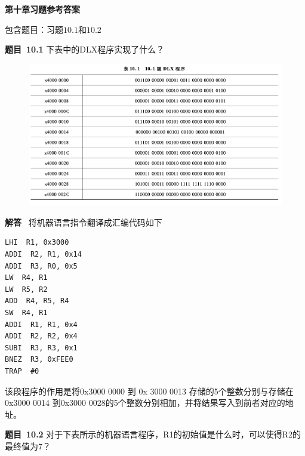 \documentclass[10pt,a4paper,UTF8]{ctexart}
\newcommand{\problemname}{待定义}
\newenvironment{problem}{\begin{shaded}\par\noindent\textbf{题目\  \problemname}}{\end{shaded}\par}
\newenvironment{solution}{\par\noindent\textbf{解答}\ }{\par}
\begin{document}
\begin{center}
\LARGE\textbf{第十章习题参考答案}
\end{center}

{\kaishu 包含题目：习题$10.1$和$10.2$}



	



\renewcommand{\problemname}{10.1}
\begin{problem}
	下表中的DLX程序实现了什么？
\end{problem}

\begin{figure}[H]
	\centering
	\includegraphics[scale=0.5]{img/10.1}
\end{figure}

\begin{solution}
	将机器语言指令翻译成汇编代码如下
	\begin{lstlisting}
LHI  R1, 0x3000       
ADDI  R2, R1, 0x14     
ADDI  R3, R0, 0x5     
LW  R4, R1            
LW  R5, R2           
ADD  R4, R5, R4
SW  R4, R1
ADDI  R1, R1, 0x4
ADDI  R2, R2, 0x4
SUBI  R3, R3, 0x1
BNEZ  R3, 0xFEE0
TRAP  #0
	\end{lstlisting}
	
	该段程序的作用是将0x3000 0000 到 0x 3000 0013 存储的5个整数分别与存储在0x3000 0014
	到0x3000 0028的5个整数分别相加，并将结果写入到前者对应的地址。
\end{solution}


\renewcommand{\problemname}{10.2}
\begin{problem}
	对于下表所示的机器语言程序，R1的初始值是什么时，可以使得R2的最终值为7？
\end{problem}
\end{document}
